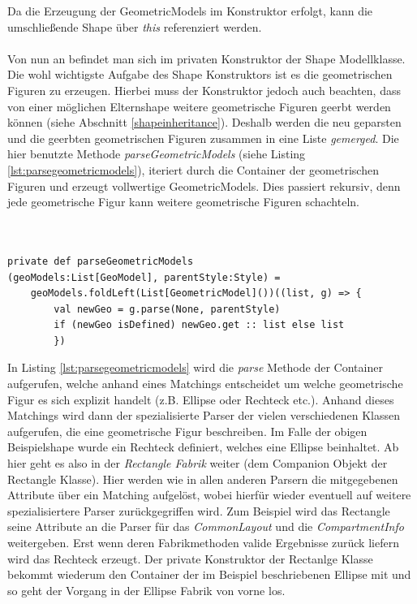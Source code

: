 Da die Erzeugung der GeometricModels im Konstruktor erfolgt, kann die umschließende Shape über \textit{this} referenziert werden.\\\\Von nun an befindet man sich im privaten Konstruktor der Shape Modellklasse. Die wohl wichtigste Aufgabe des Shape Konstruktors ist es die geometrischen Figuren zu erzeugen. Hierbei muss der Konstruktor jedoch auch beachten, dass von einer möglichen Elternshape weitere geometrische Figuren geerbt werden können (siehe Abschnitt \ref{shapeinheritance}). Deshalb werden die neu geparsten und die geerbten geometrischen Figuren zusammen in eine Liste \textit{gemerged}. Die hier benutzte Methode \textit{parseGeometricModels} (siehe Listing \ref{lst:parsegeometricmodels}), iteriert durch die Container der geometrischen Figuren und erzeugt vollwertige GeometricModels. Dies passiert rekursiv, denn jede geometrische Figur kann weitere geometrische Figuren schachteln.\\\\\\
\begin{lstlisting}[style = scala, caption = {Methode parseGeometricModels}, label = {lst:parsegeometricmodels}]
private def parseGeometricModels
(geoModels:List[GeoModel], parentStyle:Style) =
    geoModels.foldLeft(List[GeometricModel]())((list, g) => {
    	val newGeo = g.parse(None, parentStyle)
    	if (newGeo isDefined) newGeo.get :: list else list
    	})
\end{lstlisting}In Listing \ref{lst:parsegeometricmodels} wird die \textit{parse} Methode der Container aufgerufen, welche anhand eines Matchings entscheidet um welche geometrische Figur es sich explizit handelt (z.B. Ellipse oder Rechteck etc.). Anhand dieses Matchings wird dann der spezialisierte Parser der vielen verschiedenen Klassen aufgerufen, die eine geometrische Figur beschreiben. Im Falle der obigen Beispielshape wurde ein Rechteck definiert, welches eine Ellipse beinhaltet. Ab hier geht es also in der \textit{Rectangle Fabrik} weiter (dem Companion Objekt der Rectangle Klasse). Hier werden wie in allen anderen Parsern die mitgegebenen Attribute über ein Matching aufgelöst, wobei hierfür wieder eventuell auf weitere spezialisiertere Parser zurückgegriffen wird. Zum Beispiel wird das Rectangle seine Attribute an die Parser für das \textit{CommonLayout} und die \textit{CompartmentInfo} weitergeben. Erst wenn deren Fabrikmethoden valide Ergebnisse zurück liefern wird das Rechteck erzeugt. Der private Konstruktor der Rectanlge Klasse bekommt wiederum den Container der im Beispiel beschriebenen Ellipse mit und so geht der Vorgang in der Ellipse Fabrik von vorne los. 
